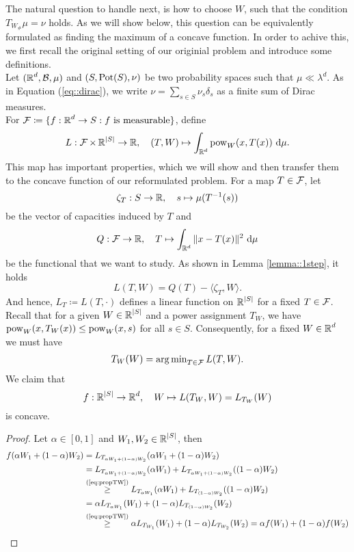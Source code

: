 \documentclass[
     12pt,         %
     a4paper,      %
     BCOR=10mm,     %
     DIV=14,        %
     ]{scrreprt}
\begin{document}
    The natural question to handle next, is how to choose $W$, such that the condition $T_{W_{\#}}\mu = \nu$ holds. As we will show below, this question can be equivalently formulated
    as finding the maximum of a concave function. In order to achive this, we first recall the original setting of our originial problem and introduce some definitions. \\[8pt]
    \indent Let $(\operatorname{\mathbb{R}}^d, \operatorname{\mathcal{B}}, \mu)$ and $(S, \operatorname{Pot}(S), \nu)$ be two probability spaces such that $\mu \ll \lambda^d$. As in Equation (\ref{eq::dirac}), we write  $\nu = \sum_{s\in S} {\nu_s \delta_{s}} $ as 
    a finite sum of Dirac measures. \\
    For $\operatorname{\mathcal{F}} \coloneqq \{ f: \operatorname{\mathbb{R}}^d \to S : f \text{ is measurable}\}$, define
    \[L: \operatorname{\mathcal{F}} \times \operatorname{\mathbb{R}}^{|S|} \to \operatorname{\mathbb{R}}, \quad (T,W) \mapsto \int_{\operatorname{\mathbb{R}}^d} \operatorname{pow}_W(x,T(x)) \ {\operatorname{{\mathrm{d}}}} \mu. \]
    This map has important properties, which we will show and then transfer them to the concave function of our reformulated problem. For a map $T\in \operatorname{\mathcal{F}}$, let 
    \[\zeta_T : S \to \operatorname{\mathbb{R}}, \quad s\mapsto \mu(T^{-1}(s)) \]
    be the vector of capacities induced by $T$ and 
    \[Q: \operatorname{\mathcal{F}} \to \operatorname{\mathbb{R}}, \quad T \mapsto \int_{\operatorname{\mathbb{R}}^d} \|x-T(x)\|^2 \ {\operatorname{{\mathrm{d}}}} \mu \]
    be the functional that we want to study. As shown in Lemma \ref{lemma::1step}, it holds
    \[L(T,W) = Q(T) - \langle \zeta_T, W \rangle. \]
    And hence, $L_T \coloneqq L(T, \cdot)$ defines a linear function on $\operatorname{\mathbb{R}}^{|S|}$ for a fixed $T \in \operatorname{\mathcal{F}}$. \\
    Recall that for a given $W \in \operatorname{\mathbb{R}}^{|S|}$ and a power assignment $T_W$, we have \\ 
    $\operatorname{pow}_W(x,T_W(x)) \le \operatorname{pow}_W(x,s)$ for all $s \in S$. Consequently, for a fixed $W \in \operatorname{\mathbb{R}}^d$ we must have 
    \begin{align} \label{eq:propTW}
        T_W(W) = \operatorname{arg\,min}_{T\in \operatorname{\mathcal{F}}} L(T,W).
    \end{align}
    We claim that \[ f : \operatorname{\mathbb{R}}^{|S|} \to \operatorname{\mathbb{R}}^d, \quad W \mapsto L(T_W, W) = L_{T_W}(W) \]
    is concave.
    \begin{proof}[Proof]
        Let $\alpha \in [0,1]$ and $W_1, W_2 \in \operatorname{\mathbb{R}}^{|S|}$, then
        \begin{align*}
            f(\alpha W_1 + (1- \alpha)W_2) &= L_{T_{\alpha W_1 + (1- \alpha)W_2}}(\alpha W_1 + (1- \alpha)W_2) \\
                                        &= L_{T_{\alpha W_1 + (1- \alpha)W_2}}(\alpha W_1) + L_{T_{\alpha W_1 + (1- \alpha)W_2}}((1-\alpha) W_2)\\
                                        &\overset {\text{(\ref{eq:propTW})}}\ge L_{T_{\alpha W_1}}(\alpha W_1) + L_{T_{(1-\alpha) W_2}}((1- \alpha) W_2) \\
                                        &= \alpha L_{T_{\alpha W_1}}(W_1) + (1-\alpha) L_{T_{(1-\alpha) W_2}}(W_2) \\ 
                                        &\overset {\text{(\ref{eq:propTW})}}\ge \alpha L_{T_{W_1}}(W_1) + (1-\alpha) L_{T_{W_2}}(W_2) = \alpha f(W_1) + (1-\alpha) f(W_2)
        \end{align*}
    \end{proof}
\end{document}
